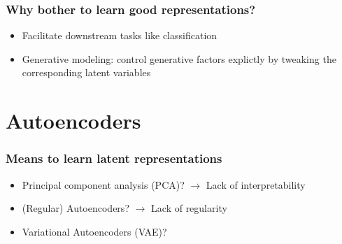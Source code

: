\documentclass{beamer}
\theoremstyle{definition}
\begin{document}
    \begin{frame}
        \frametitle{Why bother to learn good representations?}
        \begin{itemize}
          \item Facilitate downstream tasks like classification
          \item Generative modeling: control generative factors explictly by tweaking the corresponding latent variables
        \end{itemize}
      \end{frame}

    \section{Autoencoders}
    \begin{frame}
      \frametitle{Means to learn latent representations}
      \begin{itemize}
        \item Principal component analysis (PCA)? $\rightarrow$ Lack of interpretability
        \item (Regular) Autoencoders? $\rightarrow$ Lack of regularity
        \item Variational Autoencoders (VAE)?
      \end{itemize}
    \end{frame}
\end{document}
